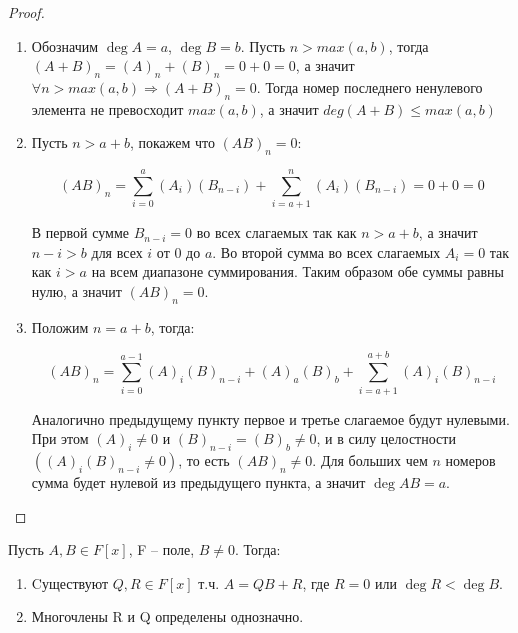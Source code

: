 \begin{proof}
    \begin{enumerate}
        \item Обозначим $\deg A = a$, $\deg B = b$. Пусть $n > max(a, b)$, тогда
        $(A+B)_n = (A)_n + (B)_n = 0 + 0 = 0$, а значит $\forall n > max(a, b) \Rightarrow (A+B)_n = 0$. 
        Тогда номер последнего ненулевого элемента не превосходит $max(a, b)$, а значит 
        $deg(A+B) \leqslant max(a, b)$

        \item Пусть $n > a + b$, покажем что $(AB)_n = 0$:
        
        $$(AB)_n = \sum_{i = 0}^{a}(A_i)(B_{n-i}) + \sum_{i = a+1}^{n}(A_i)(B_{n-i}) = 0 + 0 = 0$$

        В первой сумме $B_{n-i} = 0$ во всех слагаемых так как $n > a + b$, а значит $n - i > b$ для
        всех $i$ от $0$ до $a$. Во второй сумма во всех слагаемых $A_i = 0$ так как $i > a$ на всем
        диапазоне суммирования. Таким образом обе суммы равны нулю, а значит $(AB)_n = 0$.

        \item Положим $n = a + b$, тогда:
        
        $$(AB)_{n} = \sum_{i=0}^{a-1} (A)_i(B)_{n-i} + (A)_a(B)_b + \sum_{i=a+1}^{a+b} (A)_i(B)_{n-i}$$

        Аналогично предыдущему пункту первое и третье слагаемое будут нулевыми. 
        При этом $(A)_i \neq 0$ и $(B)_{n-i} = (B)_b \neq 0$,  и в силу целостности 
        $((A)_i(B)_{n-i} \neq 0)$, то есть $(AB)_{n} \neq 0$. Для больших
        чем $n$ номеров сумма будет нулевой из предыдущего пункта, а значит $\deg AB = a$.
    \end{enumerate}
\end{proof}

\begin{theorem}
    Пусть $A, B \in F[x]$, F -- поле, $B \neq 0$. Тогда:
    \begin{enumerate}
        \item Cуществуют $Q, R \in F[x]$ т.ч. $A = QB + R$, где $R = 0$ или $\deg R < \deg B$.
        \item Многочлены R и Q определены однозначно.
    \end{enumerate}
\end{theorem}

